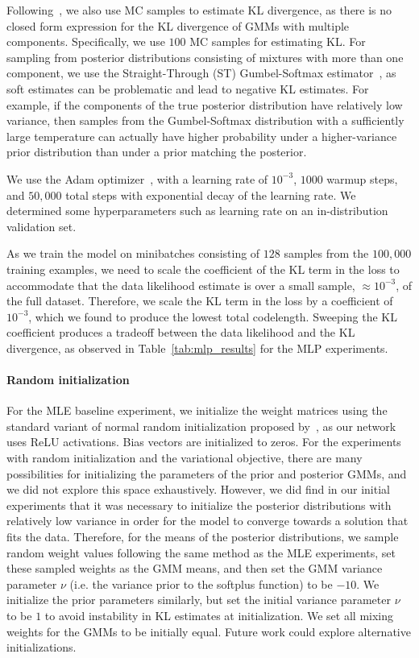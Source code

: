 Following~\citet{blundell2015weight}, we also use MC samples to estimate KL divergence, as there is no closed form expression for the KL divergence of GMMs with multiple components. Specifically, we use $100$ MC samples for estimating KL.
For sampling from posterior distributions consisting of mixtures with more than one component, we use the Straight-Through (ST) Gumbel-Softmax estimator~\citep{jang2017categorical}, as soft estimates can be problematic and lead to negative KL estimates. For example, if the components of the true posterior distribution have relatively low variance, then samples from the Gumbel-Softmax distribution with a sufficiently large temperature can actually have higher probability under a higher-variance prior distribution than under a prior matching the posterior.

We use the Adam optimizer~\citep{kingma2014adam}, with a learning rate of $10^{-3}$, $1000$ warmup steps, and $50,000$ total steps with exponential decay of the learning rate. We determined some hyperparameters such as learning rate on an in-distribution validation set. 

As we train the model on minibatches consisting of $128$ samples from the $100,000$ training examples, we need to scale the coefficient of the KL term in the loss to accommodate that the data likelihood estimate is over a small sample, $\approx 10^{-3}$, of the full dataset. Therefore, we scale the KL term in the loss by a coefficient of $10^{-3}$, which we found to produce the lowest total codelength. Sweeping the KL coefficient produces a tradeoff between the data likelihood and the KL divergence, as observed in Table~\ref{tab:mlp_results} for the MLP experiments.

\paragraph{Random initialization}
For the MLE baseline experiment, we initialize the weight matrices using the standard variant of normal random initialization proposed by~\citet{he2015delving}, as our network uses ReLU activations. Bias vectors are initialized to zeros.
For the experiments with random initialization and the variational objective, there are many possibilities for initializing the parameters of the prior and posterior GMMs, and we did not explore this space exhaustively. However, we did find in our initial experiments that it was necessary to initialize the posterior distributions with relatively low variance in order for the model to converge towards a solution that fits the data. Therefore, for the means of the posterior distributions, we sample random weight values following the same method as the MLE experiments, set these sampled weights as the GMM means, and then set the GMM variance parameter $\nu$ (i.e. the variance prior to the softplus function) to be $-10$. We initialize the prior parameters similarly, but set the initial variance parameter $\nu$ to be $1$ to avoid instability in KL estimates at initialization. We set all mixing weights for the GMMs to be initially equal. Future work could explore alternative initializations.


